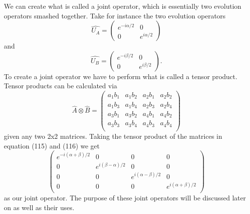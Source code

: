 \documentclass[twocolumn]{article}
\begin{document}
We can create what is called a joint operator, which is essentially two evolution operators smashed together. Take for instance the two evolution operators
\begin{equation}
\hat{U_A}=
\begin{pmatrix}
e^{-i\alpha/2} & 0 \\
0 & e^{i\alpha/2}
\end{pmatrix}
\end{equation}
and
\begin{equation}
\hat{U_B}=
\begin{pmatrix}
e^{-i\beta/2} & 0 \\
0 & e^{i\beta/2}
\end{pmatrix}.
\end{equation}
To create a joint operator we have to perform what is called a tensor product. Tensor products can be calculated via
\begin{equation}
\hat{A}\otimes\hat{B}=
\left(\begin{array}{cccc}
a_1b_1 & a_1b_2 & a_2b_1 & a_2b_2 \\
a_1b_3 & a_1b_4 & a_2b_3 & a_2b_4 \\
a_3b_1 & a_3b_2 & a_4b_1 & a_4b_2 \\
a_3b_3 & a_3b_4 & a_4b_3 & a_4b_4 \\
\end{array}\right)
\end{equation}
given any two 2x2 matrices. Taking the tensor product of the matrices in equation (115) and (116) we get
\begin{equation}
\left(\begin{array}{cccc}
e^{-i(\alpha+\beta)/2} & 0 & 0 & 0 \\
0 & e^{i(\beta-\alpha)/2} & 0 & 0 \\
0 & 0 & e^{i(\alpha-\beta)/2} & 0 \\
0 & 0 & 0 & e^{i(\alpha+\beta)/2} \\
\end{array}\right)
\end{equation}
as our joint operator. The purpose of these joint operators will be discussed later on as well as their uses.
\end{document}
